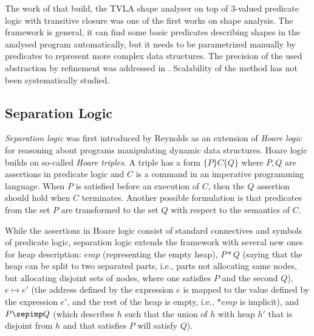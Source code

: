 	  The work of \cite{pale} that build, the TVLA shape analyser on top of 3-valued
	  predicate logic with transitive closure was one of the first works on shape analysis.
	  The framework is general, it can find some basic predicates describing shapes in the analysed
	  program automatically, but it needs to be parametrized manually by predicates to
	  represent more complex data structures.
	  The precision of the used abstraction by refinement was addressed in \cite{cav05:mcpeak_necula, beyer:lazy_shape_analysis}.
	  Scalability of the method has not been systematically studied.

	  \subsection{Separation Logic}

	  \emph{Separation logic} was first introduced by Reynolds \cite{Reynolds:SepLogic:02} as an extension
	  of \emph{Hoare logic} for reasoning about programs manipulating dynamic data structures.
	  Hoare logic builds on so-called \emph{Hoare triples}. A triple has a form $\{P\}C\{Q\}$ where
	  $P,Q$ are assertions in predicate logic and $C$ is a command in an imperative programming language.
	  When $P$ is satisfied before an execution of $C$, then the $Q$ assertion should hold
	  when $C$ terminates.
	  Another possible formulation is that predicates from the set $P$ are transformed to the set $Q$
	  with respect to the semantics of $C$.

	  While the assertions in Hoare logic consist of standard connectives and symbols of predicate logic,
	  separation logic extends the framework with several new ones for heap description: $emp$ (representing
	  the empty heap), $P*Q$ (saying that the heap can be split to two separated parts, i.e., parts not allocating same nodes, but allocating disjoint sets of nodes,
          where one satisfies $P$ and the second $Q$),
	  $e \mapsto e'$ (the address defined by the expression $e$ is mapped to the value defined
	  by the expression $e'$, and the rest of the heap is empty, i.e., $*emp$ is implicit),
	  and $P\sepimp Q$ (which describes $h$ such that the union of $h$ with heap $h'$ that is disjoint from $h$
          and that satisfies $P$ will satisfy $Q$).


